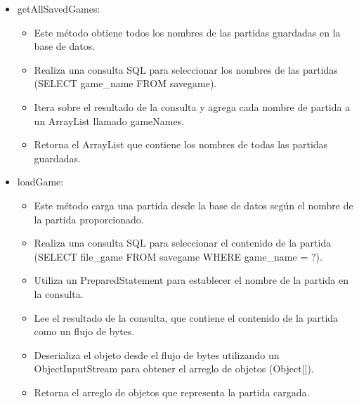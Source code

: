 \documentclass{article}
\begin{document}
        \begin{itemize}	
            \item getAllSavedGames:
            \begin{itemize}	
                \item Este método obtiene todos los nombres de las partidas guardadas en la base de datos.
                \item Realiza una consulta SQL para seleccionar los nombres de las partidas (SELECT game_name FROM savegame).
                \item Itera sobre el resultado de la consulta y agrega cada nombre de partida a un ArrayList llamado gameNames.
                \item Retorna el ArrayList que contiene los nombres de todas las partidas guardadas.
            \end{itemize}
            \item loadGame:
            \begin{itemize}	
                \item Este método carga una partida desde la base de datos según el nombre de la partida proporcionado.
                \item Realiza una consulta SQL para seleccionar el contenido de la partida (SELECT file_game FROM savegame WHERE game_name = ?).
                \item Utiliza un PreparedStatement para establecer el nombre de la partida en la consulta.
                \item Lee el resultado de la consulta, que contiene el contenido de la partida como un flujo de bytes.
                \item Deserializa el objeto desde el flujo de bytes utilizando un ObjectInputStream para obtener el arreglo de objetos (Object[]).
                \item Retorna el arreglo de objetos que representa la partida cargada.
            \end{itemize}
	\end{itemize}

    
\end{document}
